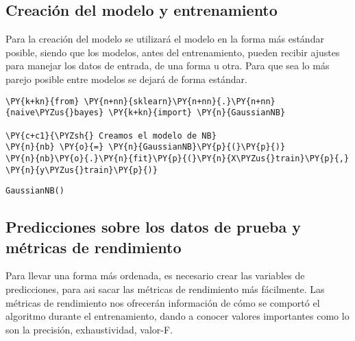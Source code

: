     \hypertarget{creaciuxf3n-del-modelo-y-entrenamiento}{%
\subsection{Creación del modelo y
entrenamiento}\label{creaciuxf3n-del-modelo-y-entrenamiento}}

Para la creación del modelo se utilizará el modelo en la forma más
estándar posible, siendo que los modelos, antes del entrenamiento,
pueden recibir ajustes para manejar los datos de entrada, de una forma u
otra. Para que sea lo más parejo posible entre modelos se dejará de
forma estándar.

    \begin{tcolorbox}[breakable, size=fbox, boxrule=1pt, pad at break*=1mm,colback=cellbackground, colframe=cellborder]
\begin{Verbatim}[commandchars=\\\{\}]
\PY{k+kn}{from} \PY{n+nn}{sklearn}\PY{n+nn}{.}\PY{n+nn}{naive\PYZus{}bayes} \PY{k+kn}{import} \PY{n}{GaussianNB}

\PY{c+c1}{\PYZsh{} Creamos el modelo de NB}
\PY{n}{nb} \PY{o}{=} \PY{n}{GaussianNB}\PY{p}{(}\PY{p}{)}
\PY{n}{nb}\PY{o}{.}\PY{n}{fit}\PY{p}{(}\PY{n}{X\PYZus{}train}\PY{p}{,} \PY{n}{y\PYZus{}train}\PY{p}{)}
\end{Verbatim}
\end{tcolorbox}

            \begin{tcolorbox}[breakable, size=fbox, boxrule=.5pt, pad at break*=1mm, opacityfill=0]
\begin{Verbatim}[commandchars=\\\{\}]
GaussianNB()
\end{Verbatim}
\end{tcolorbox}
        
    \hypertarget{predicciones-sobre-los-datos-de-prueba-y-muxe9tricas-de-rendimiento}{%
\subsection{Predicciones sobre los datos de prueba y métricas de
rendimiento}\label{predicciones-sobre-los-datos-de-prueba-y-muxe9tricas-de-rendimiento}}

Para llevar una forma más ordenada, es necesario crear las variables de
predicciones, para asi sacar las métricas de rendimiento más fácilmente.
Las métricas de rendimiento nos ofrecerán información de cómo se
comportó el algoritmo durante el entrenamiento, dando a conocer valores
importantes como lo son la precisión, exhaustividad, valor-F.

